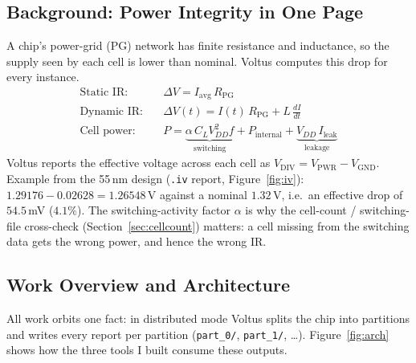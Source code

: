 \documentclass[11pt,a4paper]{article}
\newcommand{\fn}[1]{\texttt{#1}}                 %
\begin{document}
\subsection{Background: Power Integrity in One Page}
A chip's power-grid (PG) network has finite resistance and inductance, so the supply seen by
each cell is lower than nominal. Voltus computes this drop for every instance.
\begin{align*}
  \text{Static IR:}\quad & \Delta V = I_{\text{avg}}\,R_{\text{PG}}\\
  \text{Dynamic IR:}\quad & \Delta V(t) = I(t)\,R_{\text{PG}} + L\,\frac{dI}{dt}\\
  \text{Cell power:}\quad & P = \underbrace{\alpha\,C_L V_{DD}^{2} f}_{\text{switching}}
                          + P_{\text{internal}} + \underbrace{V_{DD}\,I_{\text{leak}}}_{\text{leakage}}
\end{align*}
Voltus reports the effective voltage across each cell as
$V_{\text{DIV}} = V_{\text{PWR}} - V_{\text{GND}}$. Example from the 55\,nm design
(\fn{.iv} report, Figure~\ref{fig:iv}): $1.29176 - 0.02628 = 1.26548$\,V against a nominal
$1.32$\,V, i.e.\ an effective drop of $54.5$\,mV ($4.1\%$). The switching-activity factor
$\alpha$ is why the cell-count / switching-file cross-check (Section~\ref{sec:cellcount})
matters: a cell missing from the switching data gets the wrong power, and hence the wrong IR.

\subsection{Work Overview and Architecture}
All work orbits one fact: in distributed mode Voltus splits the chip into partitions and
writes every report per partition (\fn{part\_0/}, \fn{part\_1/}, \dots). Figure~\ref{fig:arch}
shows how the three tools I built consume these outputs.
\end{document}
